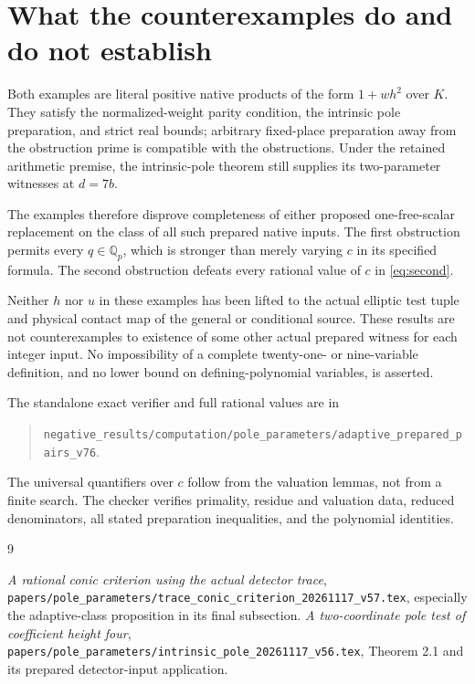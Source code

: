 \documentclass[11pt,a4paper]{article}
\newcommand{\Q}{\mathbb Q}\newcommand{\Z}{\mathbb Z}
\begin{document}
\section{What the counterexamples do and do not establish}

Both examples are literal positive native products of the form
$1+wh^2$ over $K$. They satisfy the normalized-weight parity
condition, the intrinsic pole preparation, and strict real bounds;
arbitrary fixed-place preparation away from the obstruction prime
is compatible with the obstructions.
Under the retained arithmetic premise, the intrinsic-pole theorem
still supplies its two-parameter witnesses at $d=7b$.

The examples therefore disprove completeness of either proposed
one-free-scalar replacement on the class of all such prepared
native inputs. The first obstruction permits every $q\in\Q_p$,
which is stronger than merely varying $c$ in its specified formula.
The second obstruction defeats every rational value of $c$ in
\eqref{eq:second}.

Neither $h$ nor $u$ in these examples has been lifted to the actual
elliptic test tuple and physical contact map of the general or
conditional source. These results are not counterexamples to
existence of some other actual prepared witness for each integer
input. No impossibility of a complete twenty-one- or nine-variable
definition, and no lower bound on defining-polynomial variables,
is asserted.

The standalone exact verifier and full rational values are in
\begin{quote}\small
\nolinkurl{negative_results/computation/pole_parameters/adaptive_prepared_pairs_v76}.
\end{quote}
The universal quantifiers over $c$ follow from the valuation
lemmas, not from a finite search. The checker verifies primality,
residue and valuation data, reduced denominators, all stated
preparation inequalities, and the polynomial identities.

\begin{thebibliography}{9}\raggedright
{}\emph{A rational conic criterion using the actual
detector trace},
\nolinkurl{papers/pole_parameters/trace_conic_criterion_20261117_v57.tex},
especially the adaptive-class proposition in its final subsection.
\emph{A two-coordinate pole test of coefficient
height four},
\nolinkurl{papers/pole_parameters/intrinsic_pole_20261117_v56.tex},
Theorem 2.1 and its prepared detector-input application.
\end{thebibliography}
\end{document}
